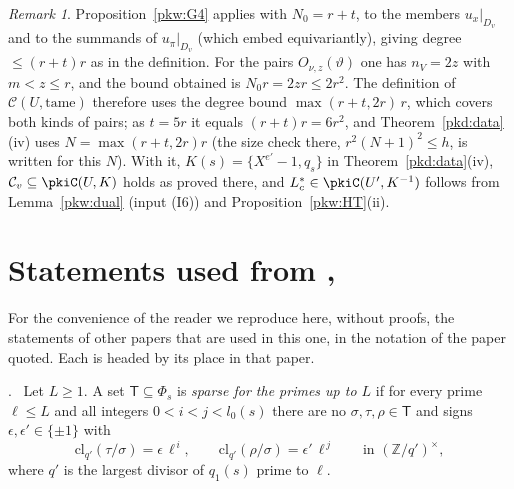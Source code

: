 \documentclass[10pt]{amsart}
\theoremstyle{definition}
\theoremstyle{remark}
\newtheorem{remark}[theorem]{Remark}
\providecommand{\anPl}{\Phi}
\providecommand{\ancl}{\mathrm{cl}}
\newenvironment{quoteddef}[2]{\par\medskip\noindent\begingroup
  \textbf{#1}#2.\ \ignorespaces}{\endgroup\par\medskip}
\begin{document}
\begin{remark}
Proposition~\ref{pkw:G4} applies with $N_0=r+t$, to the members $u_x|_{D_v}$ and to the summands of
$u_\pi|_{D_v}$ (which embed equivariantly), giving degree $\le(r+t)r$ as in the definition. For the pairs
$O_{\nu,z}(\vartheta)$ one has $n_V=2z$ with $m<z\le r$, and the bound obtained is $N_0r=2zr\le2r^2$. The
definition of $\mathcal C(U,\mathrm{tame})$ therefore uses the degree bound $\max(r+t,2r)\,r$, which covers both
kinds of pairs; as $t=5r$ it equals $(r+t)r=6r^2$, and Theorem~\ref{pkd:data}(iv) uses $N=\max(r+t,2r)r$ (the size
check there, $r^2(N+1)^2\le h$, is written for this $N$). With it, $K(s)=
\{X^{e'}-1,q_s\}$ in Theorem~\ref{pkd:data}(iv), $\mathcal C_v\subseteq\pkiC(U,K)$ holds as proved there, and
$L_c^*\in\pkiC(U',K^{-1})$ follows from Lemma~\ref{pkw:dual} (input (I6)) and Proposition~\ref{pkw:HT}(ii).
\end{remark}


\appendix

\section{Statements used from \texorpdfstring{\cite{P46}}{[P46]}, \texorpdfstring{\cite{P55}}{[P55]}}\label{C4:quoted}

For the convenience of the reader we reproduce here, without proofs, the statements of other papers that are used in this one, in the notation of the paper quoted. Each is headed by its place in that paper.

\begin{quoteddef}{\cite[Definition~13.2]{P46}}{}
Let $L\ge1$. A set $\mathsf T\subseteq\anPl_s$ is \emph{sparse for the primes
up to $L$} if for every prime $\ell\le L$ and all integers $0<i<j<l_0(s)$
there are no $\sigma,\tau,\rho\in\mathsf T$ and signs
$\epsilon,\epsilon'\in\{\pm1\}$ with
\[
 \ancl_{q'}(\tau/\sigma)=\epsilon\,\ell^{\,i},\qquad \ancl_{q'}(\rho/\sigma)=\epsilon'\,\ell^{\,j}\qquad\text{in }(\mathbb Z/q')^{\times},
\]
where $q'$ is the largest divisor of $q_1(s)$ prime to $\ell$.
\end{quoteddef}
\end{document}
